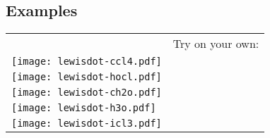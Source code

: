 \documentclass[11pt,letterpaper]{article}
\begin{document}
\subsection{Examples}

\begin{longtabu} to \linewidth {X[3.25,m] | X[1,m,c]}
						& Try on your own: \\
	\texttt{[image: lewisdot-ccl4.pdf]} &  \\
	\texttt{[image: lewisdot-hocl.pdf]} &   \\
	\texttt{[image: lewisdot-ch2o.pdf]} &    \\
	\texttt{[image: lewisdot-h3o.pdf]}  &    \\
	\texttt{[image: lewisdot-icl3.pdf]} &  \\
\end{longtabu}
\end{document}

